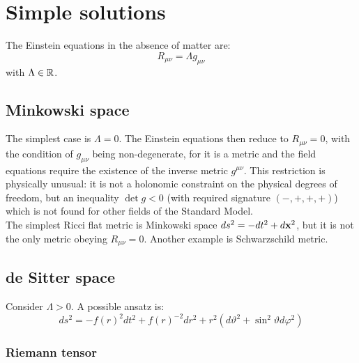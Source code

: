 \section{Simple solutions}

The Einstein equations in the absence of matter are:
\begin{equation*}
  R_{\mu \nu} = \Lambda g_{\mu \nu}
\end{equation*}
with $ \Lambda \in \mathbb{R} $.

\subsection{Minkowski space}

The simplest case is $ \Lambda = 0 $. The Einstein equations then reduce to $ R_{\mu \nu} = 0 $, with the condition of $ g_{\mu \nu} $ being non-degenerate, for it is a metric and the field equations require the existence of the inverse metric $ g^{\mu \nu} $. This restriction is physically unusual: it is not a holonomic constraint on the physical degrees of freedom, but an inequality $ \det g < 0 $ (with required signature $ (-,+,+,+) $) which is not found for other fields of the Standard Model.\\
The simplest Ricci flat metric is Minkowski space $ ds^2 = -dt^2 + d\mathbf{x}^2 $, but it is not the only metric obeying $ R_{\mu \nu} = 0 $. Another example is Schwarzschild metric.

\subsection{de Sitter space}
\label{dS-space}

Consider $ \Lambda > 0 $. A possible ansatz is:
\begin{equation*}
  ds^2 = - f(r)^2 dt^2 + f(r)^{-2} dr^2 + r^2 (d\vartheta^2 + \sin^2 \vartheta d\varphi^2)
\end{equation*}

\subsubsection{Riemann tensor}

